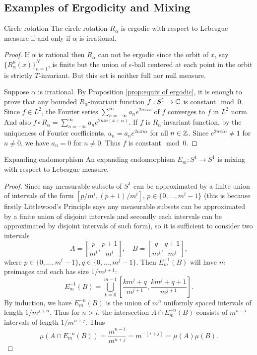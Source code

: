 \documentclass[12pt,a4paper]{article}
\begin{document}
	\subsection{Examples of Ergodicity and Mixing}
	\begin{proposition}{Circle rotation}{}
		The circle rotation $R_{\alpha}$ is ergodic with respect to Lebesgue measure if and only if $\alpha$ is irrational.
	\end{proposition}
	\begin{proof}
		If $\alpha$ is rational then $R_\alpha$ can not be ergodic since the orbit of $x$, say $\{R_\alpha^n(x)\}_{n=1}^N$, is finite but the union of $\epsilon$-ball centered at each point in the orbit is strictly $T$-invariant. But this set is neither full nor null measure.
		
		Suppose $\alpha$ is irrational. By Proposition \ref{prop:equiv of ergodic}, it is enough to prove that any bounded $R_\alpha$-invariant function $f:S^1\rightarrow \mathbb{C}$ is constant$\mod 0$. Since $f\in L^2$, the Fourier series $\sum_{n=-\infty}^{\infty}a_n e^{2n\pi i x}$ of $f$ converges to $f$ in $L^2$ norm. And also $f\circ R_\alpha=\sum_{n=-\infty}^{\infty}a_n e^{2n\pi i (x+\alpha)}$. If $f$ is $R_\alpha$-invariant function, by the uniqueness of Fourier coefficients, 
		$a_n=a_n e^{2n\pi i \alpha}$ for all $n\in\mathbb{Z}$. Since $e^{2n \pi i \alpha}\neq 1$ for $n\neq 0$, we have $a_n=0$ for $n\neq 0$. Thus $f$ is constant$\mod 0$.
	\end{proof}
	
	
	\begin{proposition}{Expanding endomorphism}{}
		An expanding endomorphism $E_m:S^1\rightarrow S^1$ is mixing with respect to Lebesgue measure. 
	\end{proposition}
	\begin{proof}
		Since any measurable subsets of $S^1$ can be approximated by a finite union of intervals of the form $[p/m^i,(p+1)/m^i]$, $p\in\{0,\dots,m^i-1\}$ (this is because firstly Littlewood's Principle says any measurable subsets can be approximated by a finite union of disjoint intervals and secondly each intervals can be approximated by disjoint intervals of such form), so it is sufficient to consider two intervals
		$$
		A=\left[\frac{p}{m^i},\frac{p+1}{m^i}\right],\quad B=\left[\frac{q}{m^j},\frac{q+1}{m^j}\right],
		$$
		where $p\in\{0,\dots,m^i-1\},q\in\{0,\dots,m^j-1\}$. Then $E_m^{-1}(B)$ will have $m$ preimages and each has size $1/m^{j+1}$:
		$$
		E_m^{-1}(B)=\bigcup_{k=0}^{m-1}\left[\frac{km^j+q}{m^{j+1}},\frac{km^j+q+1}{m^{j+1}}\right].
		$$
		By induction, we have $E_m^{-n}(B)$ is the union of $m^n$ uniformly spaced intervals of length $1/m^{j+n}$. Thus for $n>i$, the intersection $A\cap E_m^{-n}(B)$ consists of $m^{n-i}$ intervals of length $1/m^{n+j}$. Thus
		$$
		\mu(A\cap E_m^{-n}(B))=\frac{m^{n-i}}{m^{n+j}}=m^{-(i+j)}=\mu(A)\mu(B).
		$$
	\end{proof}
	
\end{document}
